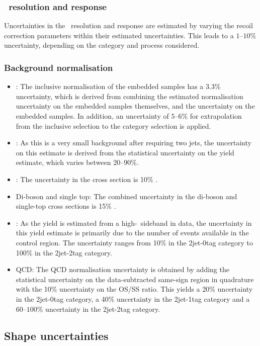 \subsubsection*{\MET~resolution and response}
Uncertainties in the \MET~resolution and response are estimated by varying
the recoil correction parameters within their estimated uncertainties. This 
leads to a $1$--$10$\% uncertainty, depending on the category and process considered.
\subsubsection*{Background normalisation}
\begin{itemize}
\setlength{\itemsep}{-0.5\baselineskip}
\item \Ztautau : The inclusive normalisation of the embedded samples has a 3.3\% uncertainty, which is derived
from combining the estimated normalisation uncertainty on the embedded samples themselves, and the uncertainty on the \ttbar embedded samples. In addition, an uncertainty of $5$--$6$\% for extrapolation from the inclusive selection to the category selection is applied.
\item \Zellell: As this is a very small background after requiring two jets, the uncertainty on this estimate is derived from the statistical uncertainty on the yield estimate, which varies between $20$--$90$\%.
\item \ttbar: The uncertainty in the \ttbar cross section is 10\% \cite{toppp}.
\item Di-boson and single top: The combined uncertainty in the di-boson and single-top cross sections is 15\% \cite{8TeVdib,8TeVst}.
\item \Wjets: As the \Wjets yield is estimated from a high-\mT~sideband in data, the uncertainty in this yield estimate is primarily due to the number of events available in the control region. The uncertainty ranges from 10\% in the 2jet-0tag category to 100\% in the 2jet-2tag category.
\item QCD: The QCD normalisation uncertainty is obtained by adding the statistical uncertainty on the data-subtracted same-sign region in quadrature with the 10\% uncertainty on the OS/SS ratio. This yields a 20\% uncertainty in the 2jet-0tag category, a 40\% uncertainty in the 2jet-1tag category and a $60$--$100$\% uncertainty in the 2jet-2tag category.
\end{itemize}
\subsection{Shape uncertainties}
\label{sec:hhh_uncerts_shape}
